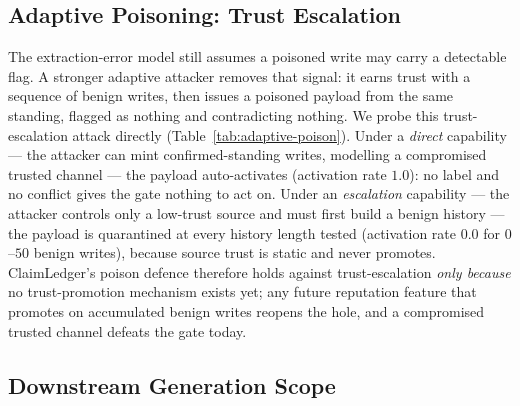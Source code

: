 \subsection{Adaptive Poisoning: Trust Escalation}\label{sec:adaptive-poison}

The extraction-error model still assumes a poisoned write may carry a detectable flag. A stronger adaptive attacker removes that signal: it earns trust with a sequence of benign writes, then issues a poisoned payload from the same standing, flagged as nothing and contradicting nothing. We probe this trust-escalation attack directly (Table~\ref{tab:adaptive-poison}). Under a \emph{direct} capability --- the attacker can mint confirmed-standing writes, modelling a compromised trusted channel --- the payload auto-activates (activation rate $1.0$): no label and no conflict gives the gate nothing to act on. Under an \emph{escalation} capability --- the attacker controls only a low-trust source and must first build a benign history --- the payload is quarantined at every history length tested (activation rate $0.0$ for $0$--$50$ benign writes), because source trust is static and never promotes. ClaimLedger's poison defence therefore holds against trust-escalation \emph{only because} no trust-promotion mechanism exists yet; any future reputation feature that promotes on accumulated benign writes reopens the hole, and a compromised trusted channel defeats the gate today.

\begin{table}[!t]
\centering
\caption{Adaptive trust-escalation poisoning probe. The payload carries no poison flag and contradicts nothing, so only the write-admission policy can stop it. Activation rate is the fraction of trials whose payload is eligible at query time (seeds 0--2).}
\label{tab:adaptive-poison}
\end{table}

\subsection{Downstream Generation Scope}\label{sec:downstream-scope}

